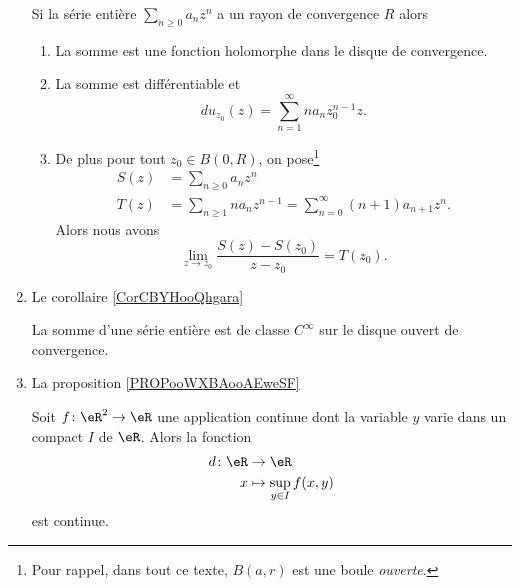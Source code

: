 \begin{enumerate}
\begin{proposition}
    Si la série entière \( \sum_{n\geq 0}a_nz^n\) a un rayon de convergence \( R\) alors
    \begin{enumerate}
        \item
            La somme est une fonction holomorphe dans le disque de convergence.
        \item      
            La somme est différentiable et
            \begin{equation}
                du_{z_0}(z)=\sum_{n=1}^{\infty}na_nz_0^{n-1}z.
            \end{equation}
        \item
    De plus pour tout \( z_0\in B(0,R)\), on pose\footnote{Pour rappel, dans tout ce texte, \( B(a,r)\) est une boule \emph{ouverte}.}
    \begin{subequations}
        \begin{align}
            S(z)&=\sum_{n\geq 0}a_nz^n\\
            T(z)&=\sum_{n\geq 1}na_nz^{n-1}=\sum_{n=0}^{\infty}(n+1)a_{n+1}z^n.
        \end{align}
    \end{subequations}
    Alors  nous avons
    \begin{equation}   
        \lim_{z\to z_0}\frac{ S(z)-S(z_0) }{ z-z_0 }=T(z_0).
    \end{equation}
    \end{enumerate}
\end{proposition}

\item Le corollaire \ref{CorCBYHooQhgara}

\begin{corollary}
    La somme d'une série entière est de classe \( C^{\infty}\) sur le disque ouvert de convergence.
\end{corollary}

\item La proposition \ref{PROPooWXBAooAEweSF}

\begin{proposition}
    Soit \( f\colon \eR^2\to \eR\) une application continue dont la variable \( y\) varie dans un compact \( I\) de \( \eR\). Alors la fonction
    \begin{equation}
        \begin{aligned}
            d\colon \eR&\to \eR \\
            x&\mapsto \sup_{y\in I} f(x,y) 
        \end{aligned}
    \end{equation}
    est continue.
\end{proposition}


\end{enumerate}
